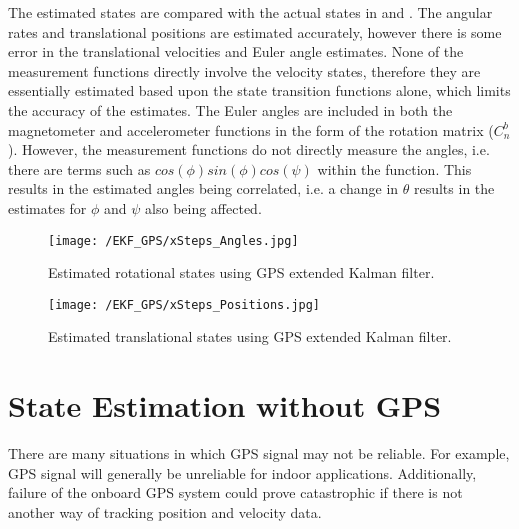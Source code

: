 The estimated states are compared with the actual states in  and . The angular rates and translational positions are estimated accurately, however there is some error in the translational velocities and Euler angle estimates. None of the measurement functions directly involve the velocity states, therefore they are essentially estimated based upon the state transition functions alone, which limits the accuracy of the estimates. The Euler angles are included in both the magnetometer and accelerometer functions in the form of the rotation matrix ($C_{n}^{b}$). However, the measurement functions do not directly measure the angles, i.e. there are terms such as $cos(\phi)sin(\phi)cos(\psi)$ within the function. This results in the estimated angles being correlated, i.e. a change in $\theta$ results in the estimates for $\phi$ and $\psi$ also being affected.
\begin{figure}[htb]
\begin{center}
	\texttt{[image: /EKF\_GPS/xSteps\_Angles.jpg]}
	\end{center}
	\caption{Estimated rotational states using GPS extended Kalman filter.}%
	\label{fig:GPS_EKF_Results_Ang}%
\end{figure}

\begin{figure}[htb]
\begin{center}
	\texttt{[image: /EKF\_GPS/xSteps\_Positions.jpg]}
	\end{center}
	\caption{Estimated translational states using GPS extended Kalman filter.}%
	\label{fig:GPS_EKF_Results_Pos}%
\end{figure}


\FloatBarrier
\section{State Estimation without GPS}
There are many situations in which GPS signal may not be reliable. For example, GPS signal will generally be unreliable for indoor applications. Additionally, failure of the onboard GPS system could prove catastrophic if there is not another way of tracking position and velocity data.
